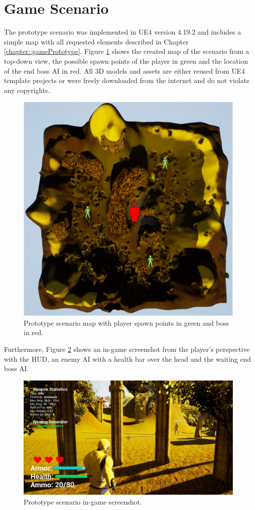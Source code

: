 \documentclass[MGS,Master,english]{twbook}%
\begin{document}
\section{Game Scenario}
The prototype scenario was implemented in \ac{UE4} version 4.19.2 and includes a simple map with all requested elements described in Chapter \ref{chapter::gamePrototype}. Figure \ref{scenarioMap} shows the created map of the scenario from a top-down view, the possible spawn points of the player in green and the location of the end boss \ac{AI} in red. All \ac{3D} models and assets are either reused from \ac{UE4} template projects or were freely downloaded from the internet and do not violate any copyrights.
\begin{figure}[!ht]
	\centering
	\includegraphics[width=0.6\linewidth]{PICs/Prototype/map_with_spawnpoints_and_boss}
	\caption{Prototype scenario map with player spawn points in green and boss in red.} \label{scenarioMap}
\end{figure}

Furthermore, Figure \ref{scenarioScreenshot} shows an in-game screenshot from the player's perspective with the \ac{HUD}, an enemy \ac{AI} with a health bar over the head and the waiting end boss \ac{AI}.
\begin{figure}[!ht]
	\centering
	\includegraphics[width=1.0\linewidth]{PICs/Prototype/ingame_screenshot_small}
	\caption{Prototype scenario in-game screenshot.} \label{scenarioScreenshot}
\end{figure}
\end{document}
